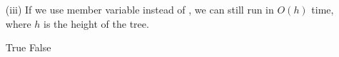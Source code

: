 \begin{parts}
\begin{enumerate}
        \item[(iii)] If we use member variable  instead of , we can still run  in $O(h)$ time, where $h$ is the height of the tree.
            \begin{oneparcheckboxes}
                \choice True
                \CorrectChoice False
            \end{oneparcheckboxes}
    \end{enumerate}



\end{parts}